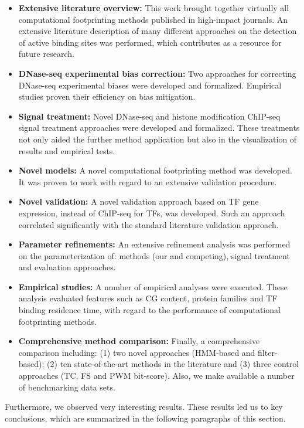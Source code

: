 \begin{itemize}
  \item \textbf{Extensive literature overview:} This work brought together virtually all computational footprinting methods published in high-impact journals. An extensive literature description of many different approaches on the detection of active binding sites was performed, which contributes as a resource for future research.
  \item \textbf{DNase-seq experimental bias correction:} Two approaches for correcting DNase-seq experimental biases were developed and formalized. Empirical studies proven their efficiency on bias mitigation.
  \item \textbf{Signal treatment:} Novel DNase-seq and histone modification ChIP-seq signal treatment approaches were developed and formalized. These treatments not only aided the further method application but also in the visualization of results and empirical tests.
  \item \textbf{Novel models:} A novel computational footprinting method was developed. It was proven to work with regard to an extensive validation procedure.
  \item \textbf{Novel validation:} A novel validation approach based on TF gene expression, instead of ChIP-seq for TFs, was developed. Such an approach correlated significantly with the standard literature validation approach.
  \item \textbf{Parameter refinements:} An extensive refinement analysis was performed on the parameterization of: methods (our and competing), signal treatment and evaluation approaches.
  \item \textbf{Empirical studies:} A number of empirical analyses were executed. These analysis evaluated features such as CG content, protein families and TF binding residence time, with regard to the performance of computational footprinting methods.
  \item \textbf{Comprehensive method comparison:} Finally, a comprehensive comparison including: (1) two novel approaches (HMM-based and filter-based); (2) ten state-of-the-art methods in the literature and (3) three control approaches (TC, FS and PWM bit-score). Also, we make available a number of benchmarking data sets.
\end{itemize}

Furthermore, we observed very interesting results. These results led us to key conclusions, which are summarized in the following paragraphs of this section.

